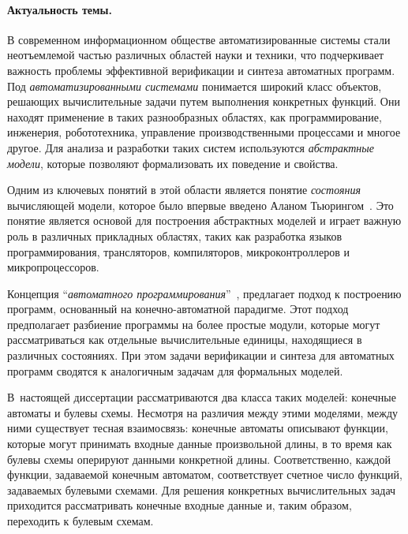 %
%
\paragraph{Актуальность темы.}
%
В современном информационном обществе автоматизированные системы стали неотъемлемой частью различных областей науки и техники, что подчеркивает важность проблемы эффективной верификации и синтеза автоматных программ.
Под \textit{автоматизированными системами} понимается широкий класс объектов, решающих вычислительные задачи путем выполнения конкретных функций.
Они находят применение в таких разнообразных областях, как программирование, инженерия, робототехника, управление производственными процессами и многое другое.
Для анализа и разработки таких систем используются \textit{абстрактные модели}, которые позволяют формализовать их поведение и свойства.

Одним из ключевых понятий в этой области является понятие \textit{состояния} вычисляющей модели, которое было впервые введено Аланом Тьюрингом~\autocite{turing1937}.
Это понятие является основой для построения абстрактных моделей и играет важную роль в различных прикладных областях, таких как разработка языков программирования, трансляторов, компиляторов, микроконтроллеров и микропроцессоров.

Концепция \enquote{\textit{автоматного программирования}}~\autocite{polikarpova2009}, предлагает подход к построению программ, основанный на конечно-автоматной парадигме.
Этот подход предполагает разбиение программы на более простые модули, которые могут рассматриваться как отдельные вычислительные единицы, находящиеся в различных состояниях.
При этом задачи верификации и синтеза для автоматных программ сводятся к аналогичным задачам для формальных моделей.

В~настоящей диссертации рассматриваются два класса таких моделей: конечные автоматы и булевы схемы.
Несмотря на различия между этими моделями, между ними существует тесная взаимосвязь: конечные автоматы описывают функции, которые могут принимать входные данные произвольной длины, в то время как булевы схемы оперируют данными конкретной длины.
Соответственно, каждой функции, задаваемой конечным автоматом, соответствует счетное число функций, задаваемых булевыми схемами.
Для решения конкретных вычислительных задач приходится рассматривать конечные входные данные и, таким образом, переходить к булевым схемам.

